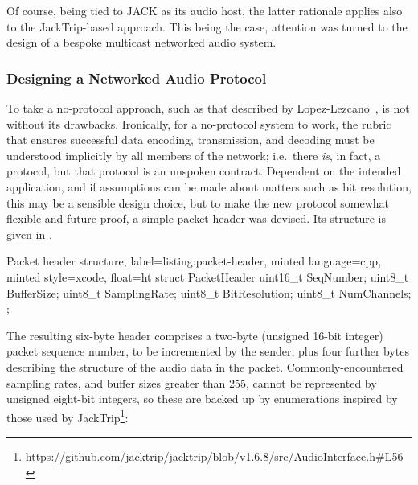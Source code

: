 Of course, being tied to JACK as its audio host, the latter rationale applies
also to the JackTrip-based approach.
This being the case, attention was turned to the design of a bespoke multicast
networked audio system.

\subsubsection{Designing a Networked Audio Protocol}\label{subsubsec:designing-a-protocol}


To take a no-protocol approach, such as that described by
Lopez-Lezcano~\citep{lopez-lezcano_jack_2012}, is not without its drawbacks.
Ironically, for a no-protocol system to
work, the rubric that ensures successful data encoding, transmission, and
decoding must be understood implicitly by all members of the network; i.e.\
there \textit{is}, in fact, a protocol, but that protocol is an unspoken
contract.
Dependent on the intended application, and if assumptions can be made about
matters such as bit resolution, this may be a sensible design choice, but to
make the new protocol somewhat flexible and future-proof, a simple packet
header was devised.
Its structure is given in .

\begin{codelisting}{
    Packet header structure,
    label=listing:packet-header,
    minted language=cpp,
    minted style=xcode,
    float=ht
}
    struct PacketHeader {
        uint16_t SeqNumber;
        uint8_t BufferSize;
        uint8_t SamplingRate;
        uint8_t BitResolution;
        uint8_t NumChannels;
    };
\end{codelisting}
\noindent
The resulting six-byte header comprises a two-byte (unsigned 16-bit integer)
packet sequence number, to be incremented by the sender, plus four further bytes
describing the structure of the audio data in the packet.
Commonly-encountered sampling rates, and buffer sizes greater than 255, cannot
be represented by unsigned eight-bit integers, so
these are backed up by enumerations inspired by those used by JackTrip\footnote{
    \url{https://github.com/jacktrip/jacktrip/blob/v1.6.8/src/AudioInterface.h\#L56}
}:

